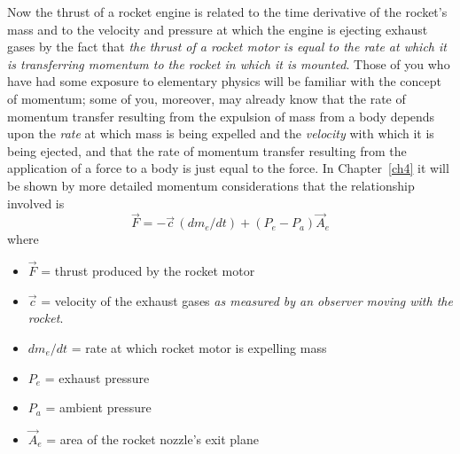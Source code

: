 Now the thrust of a rocket engine is related to the time derivative of the rocket's mass and to
the velocity and pressure at which the engine is ejecting exhaust gases by the fact that
\emph{the thrust of a rocket motor is equal to the rate at which it is transferring momentum to
the rocket in which it is mounted}. Those
of you who have had some exposure to
elementary physics will be familiar with the concept of momentum; some of you, moreover, may
already know that the rate of momentum transfer resulting from the expulsion of mass from a body
depends upon the \emph{rate} at which mass is being expelled and the \emph{velocity} with which
it is being ejected, and that the rate of momentum transfer resulting from the application of a
force to a body is just equal to the force. In Chapter~\ref{ch4} it will be shown by more
detailed momentum considerations that the relationship involved is
\begin{equation}\label{ch1:eq:1}
\vec{F} = -\vec{c}\,(dm_e/dt) + (P_e - P_a)\vec{A}_e
\end{equation}
where
\begin{itemize}[nosep,leftmargin=*,label={}]
  \item $\vec{F}$ = thrust produced by the rocket motor
  \item $\vec{c}$ = velocity of the exhaust gases \emph{as measured by an observer moving with the
    rocket}.
  \item $dm_e/dt$ = rate at which rocket motor is expelling mass
  \item $P_e$ = exhaust pressure
  \item $P_a$ = ambient pressure
  \item $\vec{A}_e$ = area of the rocket nozzle's exit plane
\end{itemize}
